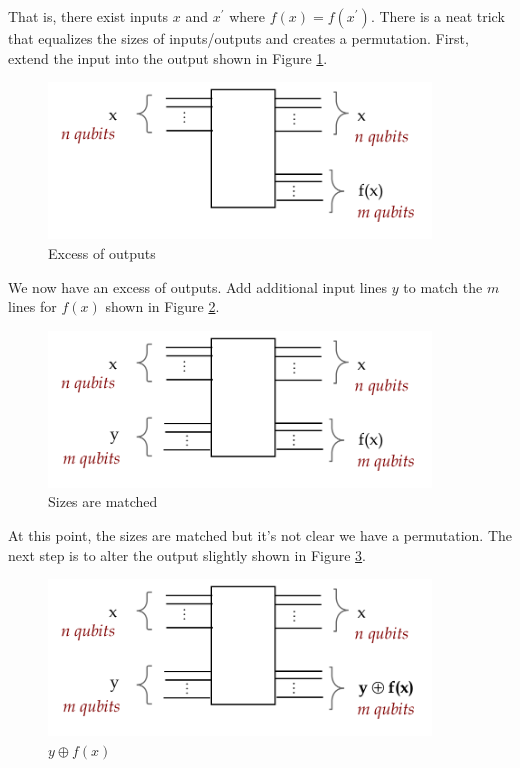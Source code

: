 \documentclass[main.tex]{subfiles}
\begin{document}
    That is, there exist inputs $x$ and $x^{\prime}$ where $f(x)=f\left(x^{\prime}\right)$. There is a neat trick that equalizes the sizes of inputs/outputs and creates a permutation. First, extend the input into the output shown in Figure \ref{fig:30permutation4}.
    
    \begin{figure}
        \centering
        \includegraphics[width=4in]{notes/figs/n10/30permutation4.png}
        \caption{Excess of outputs}
        \label{fig:30permutation4}
    \end{figure}
    
    We now have an excess of outputs. Add additional input lines $y$ to match the $m$ lines for $f(x)$ shown in Figure \ref{fig:31permutation5}.
    
    \begin{figure}
        \centering
        \includegraphics[width=4in]{notes/figs/n10/31permutation5.png}
        \caption{Sizes are matched}
        \label{fig:31permutation5}
    \end{figure}
    
    At this point, the sizes are matched but it's not clear we have a permutation. The next step is to alter the output slightly shown in Figure \ref{fig:32permutation6}.
    
    \begin{figure}
        \centering
        \includegraphics[width=4in]{notes/figs/n10/32permutation6.png}
        \caption{$y \oplus f(x)$}
        \label{fig:32permutation6}
    \end{figure}
    
\end{document}
